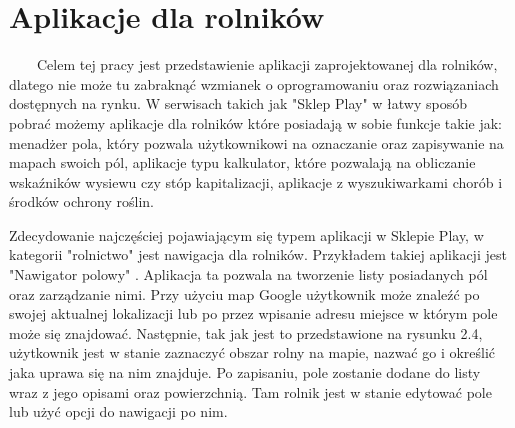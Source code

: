 \documentclass[a4paper,12pt,oneside]{book}
\begin{document}
	\section{Aplikacje dla rolników}
	\ \ \ \
	Celem tej pracy jest przedstawienie aplikacji zaprojektowanej dla rolników, dlatego nie może tu zabraknąć wzmianek o oprogramowaniu oraz rozwiązaniach dostępnych na rynku. W serwisach takich jak "Sklep Play" w łatwy sposób pobrać możemy aplikacje dla rolników które posiadają w sobie funkcje takie jak: menadżer pola, który pozwala użytkownikowi na oznaczanie oraz zapisywanie na mapach swoich pól, aplikacje typu kalkulator, które pozwalają na obliczanie wskaźników wysiewu czy stóp kapitalizacji, aplikacje z wyszukiwarkami chorób i środków ochrony roślin.
	
	Zdecydowanie najczęściej pojawiającym się typem aplikacji w Sklepie Play, w kategorii "rolnictwo" jest nawigacja dla rolników. Przykładem takiej aplikacji jest "Nawigator polowy" \cite{ref6}. Aplikacja ta pozwala na tworzenie listy posiadanych pól oraz zarządzanie nimi. Przy użyciu map Google użytkownik może znaleźć po swojej aktualnej lokalizacji lub po przez wpisanie adresu miejsce w którym pole może się znajdować. Następnie, tak jak jest to przedstawione na rysunku 2.4, użytkownik jest w stanie zaznaczyć obszar rolny na mapie, nazwać go i określić jaka uprawa się na nim znajduje. Po zapisaniu, pole zostanie dodane do listy wraz z jego opisami oraz powierzchnią. Tam rolnik jest w stanie edytować pole lub użyć opcji do nawigacji po nim.
	
\end{document}
